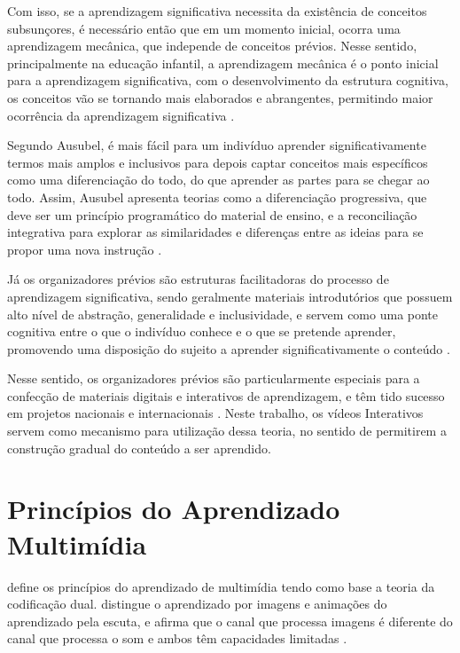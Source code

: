 Com isso, se a aprendizagem significativa necessita da existência de conceitos subsunçores, é necessário então que em um momento inicial, ocorra uma aprendizagem mecânica, que independe de conceitos prévios. Nesse sentido, principalmente na educação infantil, a aprendizagem mecânica é o ponto inicial para a aprendizagem significativa, com o desenvolvimento da estrutura cognitiva, os conceitos vão se tornando mais elaborados e abrangentes, permitindo maior ocorrência da aprendizagem significativa \cite{ausubel2000}.

Segundo Ausubel, é mais fácil para um indivíduo aprender significativamente termos mais amplos e inclusivos para depois captar conceitos mais específicos como uma diferenciação do todo, do que aprender as partes para se chegar ao todo. Assim, Ausubel apresenta teorias como a diferenciação progressiva, que deve ser um princípio programático do material de ensino, e a reconciliação integrativa para explorar as similaridades e diferenças entre as ideias para se propor uma nova instrução \cite{ausubel2000, fragelli2010}. 

Já os organizadores prévios são estruturas facilitadoras do processo de aprendizagem significativa, sendo geralmente materiais introdutórios que possuem alto nível de abstração, generalidade e inclusividade, e servem como uma ponte cognitiva entre o que o indivíduo conhece e o que se pretende aprender, promovendo uma disposição do sujeito a aprender significativamente o conteúdo \cite{ausubel2000, tavares2010}.

Nesse sentido, os organizadores prévios são particularmente especiais para a confecção de materiais digitais e interativos de aprendizagem, e têm tido sucesso em projetos nacionais e internacionais \cite{tavares2010, novak2006}. Neste trabalho, os vídeos Interativos servem como mecanismo para utilização dessa teoria, no sentido de permitirem a construção gradual do conteúdo a ser aprendido.


\section{Princípios do Aprendizado Multimídia}

\cite{mayer2001} define os princípios do aprendizado de multimídia tendo como base a teoria da codificação dual. \cite{paivio1986} distingue o aprendizado por imagens e animações do aprendizado pela escuta, e afirma que o canal que processa imagens é diferente do canal que processa o som e ambos têm capacidades limitadas \cite{tavares2010}.

